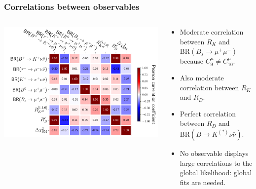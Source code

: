 \documentclass[mathserif, 10pt]{beamer}
\begin{document}
\begin{frame}
    \frametitle{Correlations between observables}

    \begin{columns}
        \begin{column}{0.5\textwidth}
            \includegraphics[width=\columnwidth]{figures/obscorr.pdf}
        \end{column}
        \begin{column}{0.5\textwidth}
            \begin{itemize}
                \item Moderate correlation between $R_K$ and $\mathrm{BR}(B_s \to \mu^+ \mu^-)$ because $C_9^\mu \neq C_{10}^\mu$.
                \item Also moderate correlation between $R_K$ and $R_D$.
                \item Perfect correlation between $R_D$ and $\mathrm{BR}(B\to K^{(*)}\nu\bar{\nu})$.
                \item No observable displays large correlations to the global likelihood: global fits are needed.
            \end{itemize}
        \end{column}
    \end{columns}

\end{frame}
\end{document}
